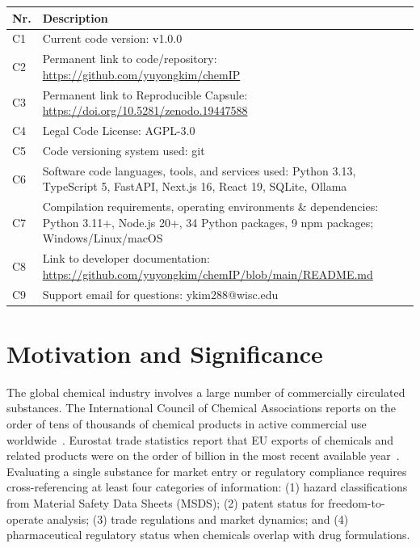 \documentclass[preprint,12pt]{elsarticle}
\begin{document}
\begin{table}[h]
\centering
\begin{tabular}{@{}lp{10cm}@{}}
\toprule
\textbf{Nr.} & \textbf{Description} \\
\midrule
C1 & Current code version: v1.0.0 \\
C2 & Permanent link to code/repository: \url{https://github.com/yuyongkim/chemIP} \\
C3 & Permanent link to Reproducible Capsule: \url{https://doi.org/10.5281/zenodo.19447588} \\
C4 & Legal Code License: AGPL-3.0 \\
C5 & Code versioning system used: git \\
C6 & Software code languages, tools, and services used: Python 3.13, TypeScript 5, FastAPI, Next.js 16, React 19, SQLite, Ollama \\
C7 & Compilation requirements, operating environments \& dependencies: Python 3.11+, Node.js 20+, 34 Python packages, 9 npm packages; Windows/Linux/macOS \\
C8 & Link to developer documentation: \url{https://github.com/yuyongkim/chemIP/blob/main/README.md} \\
C9 & Support email for questions: ykim288@wisc.edu \\
\bottomrule
\end{tabular}
\end{table}


\section{Motivation and Significance}

The global chemical industry involves a large number of commercially circulated substances. The International Council of Chemical Associations reports on the order of tens of thousands of chemical products in active commercial use worldwide~\cite{icca2024}. Eurostat trade statistics report that EU exports of chemicals and related products were on the order of  billion in the most recent available year~\cite{eurostat2025}. Evaluating a single substance for market entry or regulatory compliance requires cross-referencing at least four categories of information: (1) hazard classifications from Material Safety Data Sheets (MSDS); (2) patent status for freedom-to-operate analysis; (3) trade regulations and market dynamics; and (4) pharmaceutical regulatory status when chemicals overlap with drug formulations.
\end{document}
